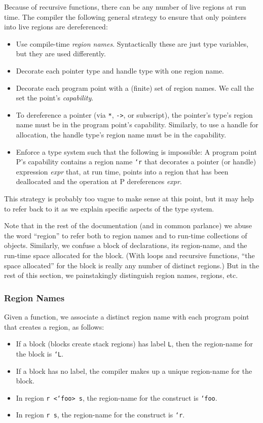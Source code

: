 Because of recursive functions, there can be any number of live
regions at run time.  The compiler the following general strategy to
ensure that only pointers into live regions are dereferenced:

\begin{itemize}
\item Use compile-time \emph{region names}.  Syntactically these are
  just type variables, but they are used differently.
\item Decorate each pointer type and handle type with one region name. 
\item Decorate each program point with a (finite) set of region names.
  We call the set the point's \emph{capability}.
\item To dereference a pointer (via \texttt{*}, \texttt{->}, or
  subscript), the pointer's type's region name must be in the program
  point's capability.  Similarly, to use a handle for allocation, the
  handle type's region name must be in the capability.
\item Enforce a type system such that the following is impossible: A
  program point P's capability contains a region name \texttt{`r} that
  decorates a pointer (or handle) expression \textit{expr} that, at
  run time, points into a region that has been deallocated and the
  operation at P dereferences \textit{expr}.
\end{itemize}

This strategy is probably too vague to make sense at this point, but
it may help to refer back to it as we explain specific aspects of the
type system.

Note that in the rest of the documentation (and in common parlance) we
abuse the word ``region'' to refer both to region names and to
run-time collections of objects.  Similarly, we confuse a block of
declarations, its region-name, and the run-time space allocated for
the block.  (With loops and recursive functions, ``the space
allocated'' for the block is really any number of distinct regions.)
But in the rest of this section, we painstakingly distinguish
region names, regions, etc.

\subsubsection{Region Names}

Given a function, we associate a distinct region name with each
program point that creates a region, as follows:

\begin{itemize}
\item If a block (blocks create stack regions) has label \texttt{L},
  then the region-name for the block is \texttt{`L}.
\item If a block has no label, the compiler makes up a unique
  region-name for the block.
\item In region \texttt{r <`foo> s}, the region-name for the construct
  is \texttt{`foo}.
\item In region \texttt{r s}, the region-name for the construct is
  \texttt{`r}.
\end{itemize}

